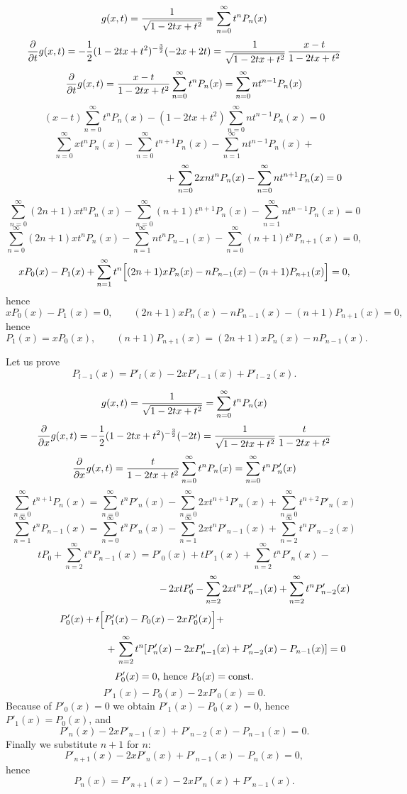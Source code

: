{\color{OliveGreen}
\bproof

$$
   g(x,t)={1\over\sqrt{1-2tx+t^2}}=\sum_{n=0}^\infty t^nP_n(x)
$$
$$
   {\partial\over\partial t}g(x,t)=-{1\over 2}(1-2tx+t^2)^{-{3\over 2}}
   (-2x+2t)={1\over\sqrt{1-2tx+t^2}}\,{x-t\over1-2tx+t^2}
$$
$$
   {\partial\over\partial t}g(x,t)={x-t\over1-2tx+t^2}
   \sum_{n=0}^\infty t^nP_n(x)=\sum_{n=0}^\infty nt^{n-1}P_n(x)
$$
$$
   (x-t)\sum_{n=0}^\infty t^nP_n(x)-(1-2tx+t^2)
   \sum_{n=0}^\infty nt^{n-1}P_n(x)=0
$$
$$
   \sum_{n=0}^\infty xt^nP_n(x)-
   \sum_{n=0}^\infty t^{n+1}P_n(x)-
   \sum_{n=1}^\infty nt^{n-1}P_n(x)+
$$
$$
   \hspace*{5cm}+\,\sum_{n=0}^\infty 2xnt^nP_n(x)-
   \sum_{n=0}^\infty nt^{n+1}P_n(x)=0
$$
$$
   \sum_{n=0}^\infty (2n+1)xt^nP_n(x)-
   \sum_{n=0}^\infty (n+1)t^{n+1}P_n(x)-
   \sum_{n=1}^\infty nt^{n-1}P_n(x)=0
$$
$$
   \sum_{n=0}^\infty (2n+1)xt^nP_n(x)-
   \sum_{n=1}^\infty nt^{n}P_{n-1}(x)-
   \sum_{n=0}^\infty (n+1)t^nP_{n+1}(x)=0,
$$
$$
   xP_0(x)-P_1(x)+\sum_{n=1}^\infty t^n\Bigl[(2n+1)xP_n(x)-nP_{n-1}(x)
   -(n+1)P_{n+1}(x)\Bigr]=0,
$$
hence
$$
    xP_0(x)-P_1(x)=0, \qquad (2n+1)xP_n(x)-nP_{n-1}(x)-
   (n+1)P_{n+1}(x)=0,
$$
hence
$$
  P_1(x)=xP_0(x), \qquad (n+1)P_{n+1}(x)=
   (2n+1)xP_n(x)-nP_{n-1}(x).
$$

\eproof
}


Let us prove
\begin{equation}
P_{l-1}(x)=P'_l(x)-2xP'_{l-1}(x)+P'_{l-2}(x) .
\label{2020-lp2}
\end{equation}

{\color{OliveGreen}
\bproof


$$
   g(x,t)={1\over\sqrt{1-2tx+t^2}}=\sum_{n=0}^\infty t^nP_n(x)
$$
$$
   {\partial\over\partial x}g(x,t)=-{1\over 2}(1-2tx+t^2)^{-{3\over 2}}
   (-2t)={1\over\sqrt{1-2tx+t^2}}\,{t\over1-2tx+t^2}
$$
$$
   {\partial\over\partial x}g(x,t)={t\over1-2tx+t^2}
   \sum_{n=0}^\infty t^nP_n(x)=\sum_{n=0}^\infty t^{n}P'_n(x)
$$
$$
   \sum_{n=0}^\infty t^{n+1}P_n(x)=\sum_{n=0}^\infty t^{n}P'_n(x)-
   \sum_{n=0}^\infty 2xt^{n+1}P'_n(x)+\sum_{n=0}^\infty t^{n+2}P'_n(x)
$$
$$
   \sum_{n=1}^\infty t^{n}P_{n-1}(x)=\sum_{n=0}^\infty t^{n}P'_n(x)-
   \sum_{n=1}^\infty 2xt^{n}P'_{n-1}(x)+\sum_{n=2}^\infty t^{n}P'_{n-2}(x)
$$
$$
   tP_0+\sum_{n=2}^\infty t^{n}P_{n-1}(x)=P'_0(x)+tP'_1(x)+
   \sum_{n=2}^\infty t^{n}P'_n(x)-
$$
$$
   \hspace*{5cm}-\,2xtP'_0-\sum_{n=2}^\infty 2xt^{n}P'_{n-1}(x)+
   \sum_{n=2}^\infty t^{n}P'_{n-2}(x)
$$
$$
   P'_0(x)+t\Bigl[P'_1(x)-P_0(x)-2xP'_0(x)\Bigr]+\hspace*{3cm}
$$
$$
   \hspace*{3cm}+\,\sum_{n=2}^\infty t^{n}[P'_n(x)-2xP'_{n-1}(x)+P'_{n-2}(x)-
   P_{n-1}(x)]=0
$$
$$
   P'_0(x)=0\textrm{, hence } P_0(x)={\rm const.}
$$
$$
   P'_1(x)-P_0(x)-2xP'_0(x)=0.
$$
Because of $P'_0(x)=0$ we obtain $P'_1(x)-P_0(x)=0$, hence $P'_1(x)=P_0(x)$, and
$$
   P'_n(x)-2xP'_{n-1}(x)+P'_{n-2}(x)-P_{n-1}(x)=0.
$$
Finally we substitute $n+1$ for $n$:
$$
   P'_{n+1}(x)-2xP'_{n}(x)+P'_{n-1}(x)-P_{n}(x)=0,
$$
hence
$$
    P_n(x)=P'_{n+1}(x)-2xP'_{n}(x)+P'_{n-1}(x).
$$

\eproof
}

